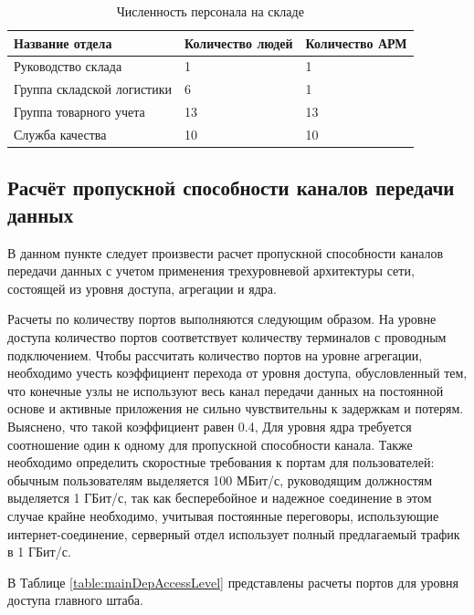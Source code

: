 \documentclass[14pt, a4paper]{extarticle}
\numberwithin{equation}{section}
\begin{document}
\begin{table}[H]
\centering
\small
\caption{Численность персонала на складе}
\label{table:warehousePopul}
\begin{tabular}{|m{4cm}|m{3cm}|m{3cm}|}
\hline
\textbf{Название отдела} & \textbf{Количество людей} & \textbf{Количество АРМ} \\
\hline
Руководство склада & 1 & 1 \\
\hline
Группа складской логистики & 6 & 1 \\
\hline
Группа товарного учета & 13 & 13 \\
\hline
Служба качества & 10 & 10 \\
\hline
\end{tabular}
\end{table}


\subsection{Расчёт пропускной способности каналов передачи данных}
В данном пункте следует произвести расчет пропускной способности каналов передачи 
данных с учетом применения трехуровневой архитектуры сети, состоящей 
из уровня доступа, агрегации и ядра. 

Расчеты по количеству портов выполняются следующим образом.
На уровне доступа количество портов соответствует количеству терминалов 
с проводным подключением. 
Чтобы рассчитать количество портов на уровне агрегации, необходимо 
учесть коэффициент перехода от уровня доступа, обусловленный тем, 
что конечные узлы не используют весь канал передачи данных на 
постоянной основе и активные приложения не сильно 
чувствительны к задержкам и потерям. Выяснено, что такой коэффициент равен 0.4,
Для уровня ядра требуется соотношение один к одному для пропускной способности канала.
Также необходимо определить скоростные требования
к портам для пользователей: обычным пользователям выделяется 
100 МБит/с, руководящим должностям выделяется 1 ГБит/с, так как 
бесперебойное и надежное соединение в 
этом случае крайне необходимо, учитывая постоянные 
переговоры, использующие интернет-соединение, серверный отдел 
использует полный предлагаемый трафик в 1 ГБит/с. 

В Таблице \ref{table:mainDepAccessLevel} представлены расчеты портов для уровня доступа 
главного штаба.
\end{document}
